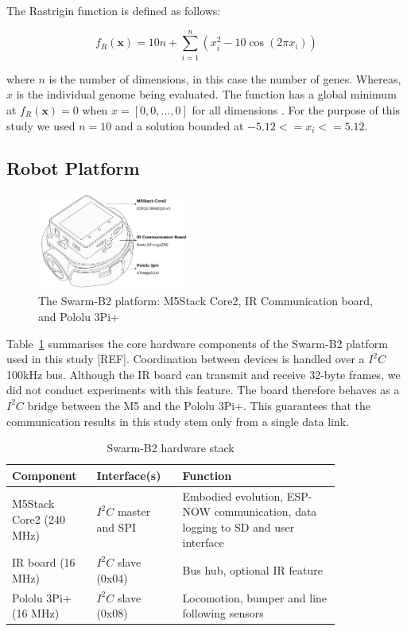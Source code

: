 \documentclass[conference]{IEEEtran}
\begin{document}
The Rastrigin function is defined as follows:

\begin{equation}\label{eq:rastrigin}
f_R(\mathbf{x}) = 10n + \sum_{i=1}^{n} \left(x_i^2 - 10\cos(2\pi x_i)\right)
\end{equation}

where $n$ is the number of dimensions, in this case the number of genes. Whereas, $x$ is the individual genome being evaluated. The function has a global minimum at \( f_R(\mathbf{x}) = 0 \) when $x = [0, 0, ..., 0]$ for all dimensions \cite{rucinski_impact_2010}. For the purpose of this study we used $n = 10$ and a solution bounded at $-5.12<=x_i<=5.12$.

\subsection{Robot Platform}\label{sec:robot_platform}
\begin{figure}[h]
    \centering
    \includegraphics[width=0.45\textwidth]{B2.pdf}
    \caption{The Swarm-B2 platform: M5Stack Core2, IR Communication board, and Pololu 3Pi+}
    \label{fig:B2}
\end{figure}

Table~\ref{tab:B2-hardware} summarises the core hardware components of the Swarm-B2 platform used in this study [REF]. Coordination between devices is handled over a $I^2C$ 100kHz bus. Although the IR board can transmit and receive 32-byte frames, we did not conduct experiments with this feature. The board therefore behaves as a $I^2C$ bridge between the M5 and the Pololu 3Pi+. This guarantees that the communication results in this study stem only from a single data link.\\

\begin{table}[h]
  \centering
  \caption{Swarm-B2 hardware stack}
  \label{tab:B2-hardware}
  \begin{tabular}{p{0.18\linewidth} p{0.22\linewidth} p{0.42\linewidth}}
    \toprule
    Component & Interface(s) & Function \\
    \midrule
    M5Stack Core2 (240 MHz) & $I^2C$ master and SPI & Embodied evolution, ESP-NOW communication, data logging to SD and user interface \\
    IR board (16 MHz) & $I^2C$ slave (0x04) & Bus hub, optional IR feature \\
    Pololu 3Pi+ (16 MHz) & $I^2C$ slave (0x08) & Locomotion, bumper and line following sensors \\

    \bottomrule
  \end{tabular}
\end{table}
\end{document}
